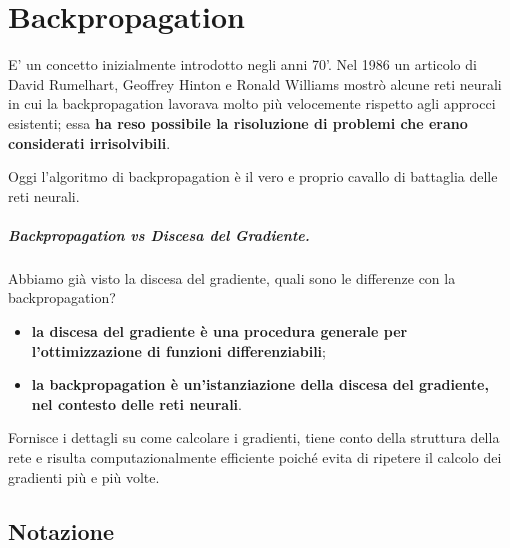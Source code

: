 \chapter{Backpropagation}
E' un concetto inizialmente introdotto negli anni 70'. Nel 1986 un articolo di David Rumelhart, Geoffrey Hinton e Ronald Williams mostrò alcune reti neurali in cui la backpropagation lavorava molto più velocemente rispetto agli approcci esistenti; essa \textbf{ha reso possibile la risoluzione di problemi che erano considerati irrisolvibili}.


Oggi l'algoritmo di backpropagation è il vero e proprio cavallo di battaglia delle reti neurali.

\paragraph{Backpropagation vs Discesa del Gradiente.} Abbiamo già visto la discesa del gradiente, quali sono le differenze con la backpropagation?
\begin{itemize}
    \item \textbf{la discesa del gradiente è una procedura generale per l'ottimizzazione di funzioni differenziabili};
    \item \textbf{la backpropagation è un'istanziazione della discesa del gradiente, nel contesto delle reti neurali}.
\end{itemize}
Fornisce i dettagli su come calcolare i gradienti, tiene conto della struttura della rete e risulta computazionalmente efficiente poiché evita di ripetere il calcolo dei gradienti più e più volte.

\section{Notazione}
